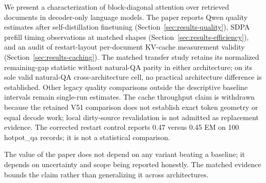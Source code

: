 We present a characterization of block-diagonal attention over retrieved
documents in decoder-only language models. The paper reports Qwen quality
estimates after self-distillation finetuning (Section~\ref{sec:results-quality}),
SDPA prefill timing observations at matched shapes
(Section~\ref{sec:results-efficiency}), and an audit of restart-layout per-document
KV-cache measurement validity (Section~\ref{sec:results-caching}). The matched
transfer study retains its normalized remaining-gap statistic without natural-QA parity in either
architecture; on its sole valid natural-QA cross-architecture cell, no
practical architecture difference is established. Other legacy quality
comparisons outside the descriptive baseline intervals remain single-run
estimates. The cache throughput claim is withdrawn because the retained V51
comparison does not establish exact token geometry or equal decode work;
local dirty-source revalidation is not admitted as replacement evidence. The
corrected restart control reports 0.47 versus 0.45 EM on 100 hotpot\_qa
records; it is not a statistical comparison.

The value of the paper does not depend on any variant beating a baseline; it
depends on uncertainty and scope being reported honestly. The matched evidence
bounds the claim rather than generalizing it across architectures.
